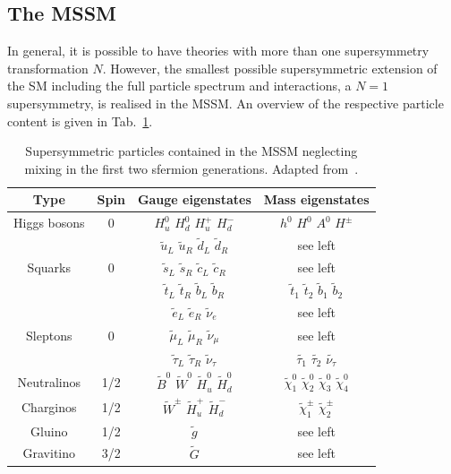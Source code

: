 \subsection{The MSSM}
\label{subsec:mssm}
In general, it is possible to have theories with more than one supersymmetry transformation $N$. However, the smallest possible supersymmetric extension of the SM including the full particle spectrum and interactions, \ie a $N = 1$ supersymmetry, is realised in the MSSM. An overview of the respective particle content is given in Tab.~\ref{tab:particle_content}. 
\begin{table}[!t] 
  \centering
    \begin{tabular}{cccc}
      \toprule
      Type & Spin & Gauge eigenstates & Mass eigenstates \\
      \midrule
      \midrule
      Higgs bosons & 0 & $H_{u}^{0}$ $H_{d}^{0}$ $H_{u}^{+}$ $H_{d}^{-}$ & $h^{0}$ $H^{0}$ $A^{0}$ $H^{\pm}$  \\
      \midrule
      & & $\tilde{u}_{L}$ $\tilde{u}_{R}$ $\tilde{d}_{L}$ $\tilde{d}_{R}$ &  see left \\
      Squarks & 0 & $\tilde{s}_{L}$ $\tilde{s}_{R}$ $\tilde{c}_{L}$ $\tilde{c}_{R}$  & see left \\
      & & $\tilde{t}_{L}$ $\tilde{t}_{R}$ $\tilde{b}_{L}$ $\tilde{b}_{R}$ & $\tilde{t}_{1}$ $\tilde{t}_{2}$ $\tilde{b}_{1}$ $\tilde{b}_{2}$ \\
      \midrule
      & & $\tilde{e}_{L}$ $\tilde{e}_{R}$ $\tilde{\nu}_{e}$ &  see left \\
      Sleptons  & 0 & $\tilde{\mu}_{L}$ $\tilde{\mu}_{R}$ $\tilde{\nu}_{\mu}$ & see left \\
      & & $\tilde{\tau}_{L}$ $\tilde{\tau}_{R}$ $\tilde{\nu}_{\tau}$ & $\tilde{\tau_{1}}$ $\tilde{\tau_{2}}$ $\tilde{\nu_{\tau}}$ \\
      \midrule
      Neutralinos  & 1/2 & $\tilde{B}^{0}$ $\tilde{W}^{0}$ $\tilde{H}_{u}^{0}$ $\tilde{H}_{d}^{0}$ & $\tilde{\chi}_{1}^{0}$ $\tilde{\chi}_{2}^{0}$ $\tilde{\chi}_{3}^{0}$ $\tilde{\chi}_{4}^{0}$ \\
      \midrule
      Charginos & 1/2 & $\tilde{W}^{\pm}$ $\tilde{H}_{u}^{+}$ $\tilde{H}_{d}^{-}$ & $\tilde{\chi}_{1}^{\pm}$ $\tilde{\chi}_{2}^{\pm}$ \\
      \midrule
      Gluino & 1/2 & $\tilde{g}$ & see left \\
      \midrule
      Gravitino & 3/2 & $\tilde{G}$ & see left \\
      \bottomrule
    \end{tabular}%
 \caption{Supersymmetric particles contained in the MSSM neglecting mixing in the first two sfermion generations. Adapted from~\cite{Martin:1997ns}.} 
  \label{tab:particle_content}
\end{table}
